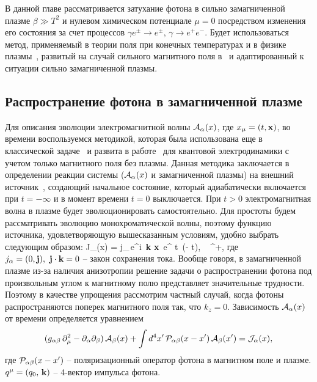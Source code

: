 В данной главе рассматривается затухание фотона в сильно замагниченной плазме $\beta \gg T^2$
 и нулевом химическом потенциале $\mu = 0$ посредством изменения его состояния за счет процессов $\gamma e^\pm\to e^\pm$, $\gamma \to e^+e^-$. Будет использоваться метод, применяемый в теории поля при конечных температурах и в физике плазмы~\cite{Boyan}, развитый на случай сильного магнитного поля в~\cite{MikhChist:2001} и адаптированный к ситуации сильно замагниченной плазмы.

\subsection{Распространение фотона в замагниченной плазме}

Для описания эволюции электромагнитной волны ${\cal A}_{\alpha}(x)$, где $x_\mu = (t, {\bf x})$, 
во времени воспользуемся методикой, которая была использована еще в классической задаче~\cite{Landau:1946} и развита  в работе~\cite{MikhChist:2001} для квантовой электродинамики с учетом только магнитного поля без плазмы. Данная методика заключается в определении реакции системы 
(${\cal A}_{\alpha}(x)$ и замагниченной плазмы) на внешний источник~\cite{Kirzhnits:1987}, создающий начальное состояние, который адиабатически включается 
при $t = - \infty$ и в момент времени $t = 0$ выключается. При $t > 0$
электромагнитная волна в плазме будет эволюционировать самостоятельно. Для простоты будем рассматривать эволюцию монохроматической волны, поэтому 
функцию источника, удовлетворяющую вышесказанным условиям, удобно выбрать следующим образом:
%
\beq
{\cal J}_{\alpha}(x) = j_{\alpha}\,e^{i \,{\bf k} {\bf x}}\,
e^{ \varepsilon t}\, \theta(- t), \,\,\, \varepsilon {}^+,
\label{eq:1}
\eeq
где $j_{\alpha} = (0, {\bf j}),\,\,{\bf j} \cdot {\bf k} = 0$ – закон сохранения тока. Вообще говоря, в замагниченной плазме из-за наличия анизотропии решение задачи о распространении фотона под произвольным углом к магнитному полю представляет значительные трудности. Поэтому в качестве упрощения рассмотрим частный случай, когда фотоны распространяются поперек магнитного поля так, что $k_z=0$. Зависимость ${\cal A}_{\alpha}(x)$ от времени  определяется уравнением
%
\begin{eqnarray}\label{eq:WaveEq}
(g_{\alpha \beta} \, \partial_{\mu}^2  -
\partial_{\alpha}\partial_{\beta}) \, {\cal A}_{\beta}(x) + 
\int d^4 x'\, {\cal P}_{\alpha \beta} (x - x') \, {\cal A}_{\beta}(x')
= {\cal J}_{\alpha}(x),
\label{eq:2}
\end{eqnarray}
где ${\cal P}_{\alpha \beta} (x - x')$ -- поляризационный оператор фотона в магнитном поле и плазме. $q^{\mu} = (q_0,\, {\bf k})$ -- 4-вектор импульса фотона.

